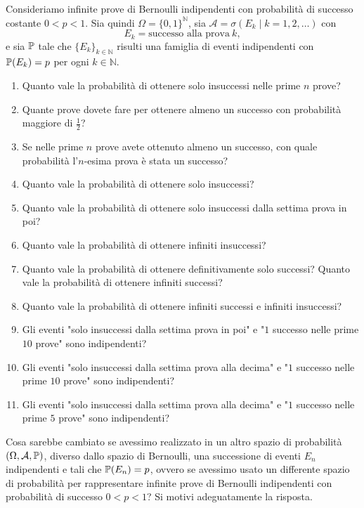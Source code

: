 
Consideriamo infinite prove di Bernoulli indipendenti con probabilità di successo costante $0< p< 1$. Sia quindi $\Omega =\{0,1\}^{\mathbb{N}}$, sia $\mathcal{A} =\sigma (E_{k} \mid k=1,2,\dots)$ con
\begin{equation*}
	E_{k} =\text{successo alla prova} \ k,
\end{equation*}
e sia $\mathbb{P}$ tale che $\{E_{k}\}_{k\in \mathbb{N}}$ risulti una famiglia di eventi indipendenti con $\mathbb{P}(E_{k}) =p$ per ogni $k\in \mathbb{N}$.
\begin{enumerate}
	\item Quanto vale la probabilità di ottenere solo insuccessi nelle prime $n$ prove?
	\item Quante prove dovete fare per ottenere almeno un successo con probabilità maggiore di $\frac{1}{2}$?
	\item Se nelle prime $n$ prove avete ottenuto almeno un successo, con quale probabilità l'$n$-esima prova è stata un successo?
	\item Quanto vale la probabilità di ottenere solo insuccessi?
	\item Quanto vale la probabilità di ottenere solo insuccessi dalla settima prova in poi?
	\item Quanto vale la probabilità di ottenere infiniti insuccessi?
	\item Quanto vale la probabilità di ottenere definitivamente solo successi? Quanto vale la probabilità di ottenere infiniti successi?
	\item Quanto vale la probabilità di ottenere infiniti successi e infiniti insuccessi?
	\item Gli eventi "solo insuccessi dalla settima prova in poi" e "$1$ successo nelle prime $10$ prove" sono indipendenti?
	\item Gli eventi "solo insuccessi dalla settima prova alla decima" e "$1$ successo nelle prime $10$ prove" sono indipendenti?
	\item Gli eventi "solo insuccessi dalla settima prova alla decima" e "$1$ successo nelle prime $5$ prove" sono indipendenti?
\end{enumerate}
Cosa sarebbe cambiato se avessimo realizzato in un altro spazio di probabilità $(\Omega ,\mathcal{A} ,\mathbb{P})$, diverso dallo spazio di Bernoulli, una successione di eventi $E_{n}$ indipendenti e tali che $\mathbb{P}(E_{n}) =p$, ovvero se avessimo usato un differente spazio di probabilità per rappresentare infinite prove di Bernoulli indipendenti con probabilità di successo $0< p< 1$? Si motivi adeguatamente la risposta.

